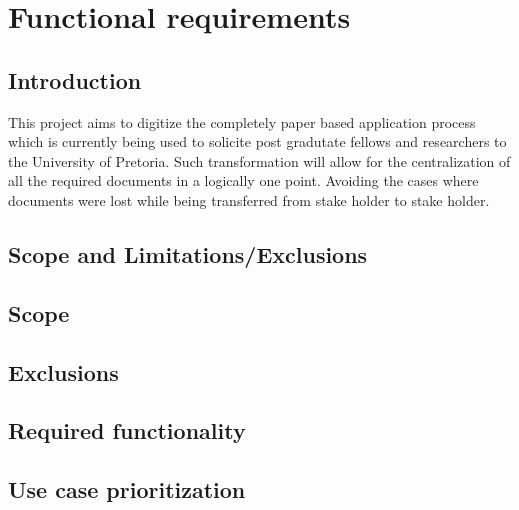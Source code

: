 \documentclass[12pt]{article}
\begin{document}
	\newpage	
	\section{Functional requirements}
		\subsection{Introduction} %
		\vspace{0.2in}
		This project aims to digitize the completely paper based application process which is currently being used to solicite post gradutate fellows and researchers to the University of Pretoria. Such transformation will allow for the centralization of all the required documents in a logically one point. Avoiding the cases where documents were lost while being transferred from stake holder to stake holder.
		\vspace{0.2in}
		
		\subsection{Scope and Limitations/Exclusions} %
		\vspace{0.2in}
		\subsection{Scope}
		\vspace{0.2in}
		
		\vspace{0.2in}
		\subsection{Exclusions}
		\vspace{0.2in}
		
		\vspace{0.2in}
		
		\subsection{Required functionality} %
		\vspace{0.2in}
		
		\vspace{0.2in}
		
		\subsection{Use case prioritization} %
		\vspace{0.2in}
		
\end{document}
